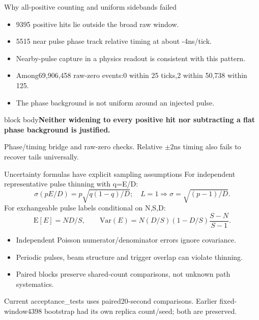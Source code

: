 \documentclass[aspectratio=169,11pt]{beamer}
\newcommand{\source}[1]{\par\vfill{\scriptsize\color{muted}#1\par}}
\newcommand{\takeaway}[1]{\begin{beamercolorbox}[sep=2.5mm,wd=\linewidth]{block body}\textbf{#1}\end{beamercolorbox}}
\begin{document}
\begin{frame}{Why all-positive counting and uniform sidebands failed}
\small\begin{itemize}\setlength\itemsep{3mm}
\item 9395 positive hits lie outside the broad raw window.
\item 5515 near pulse phase track relative timing at about -4ns/tick.
\item Nearby-pulse capture in a physics readout is consistent with this pattern.
\item Among69,906,458 raw-zero events:0 within 25 ticks,2 within 50,738 within 125.
\item The phase background is not uniform around an injected pulse.
\end{itemize}\vspace{3mm}
\takeaway{Neither widening to every positive hit nor subtracting a flat phase background is justified.}
\source{Phase/timing bridge and raw-zero checks. Relative $\pm2$ns timing also fails to recover tails universally.}
\end{frame}

\begin{frame}{Uncertainty formulas have explicit sampling assumptions}
\small For independent representative pulse thinning with q=E/D:
\[\sigma(pE/D)=p\sqrt{q(1-q)/D};\quad L=1\Rightarrow\sigma=\sqrt{(p-1)/D}.\]
For exchangeable pulse labels conditional on N,S,D:
\[\mathrm E[E]=ND/S,\qquad\mathrm{Var}(E)=N(D/S)(1-D/S)\frac{S-N}{S-1}.\]
\begin{itemize}\setlength\itemsep{2mm}
\item Independent Poisson numerator/denominator errors ignore covariance.
\item Periodic pulses, beam structure and trigger overlap can violate thinning.
\item Paired blocks preserve shared-count comparisons, not unknown path systematics.
\end{itemize}
\source{Current acceptance\_tests uses paired20-second comparisons. Earlier fixed-window4398 bootstrap had its own replica count/seed; both are preserved.}
\end{frame}
\end{document}

